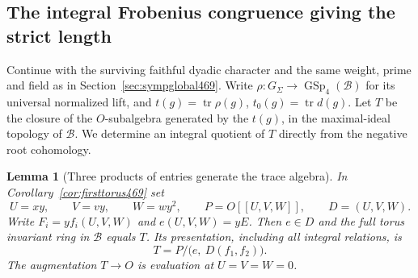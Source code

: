 \documentclass[a4paper,11pt]{article}
\newtheorem{lemma}[proposition]{Lemma}
\theoremstyle{definition}
\theoremstyle{remark}
\numberwithin{equation}{section}
\begin{document}
\subsection{The integral Frobenius congruence giving the strict length}
\label{sec:symptrace470}

Continue with the surviving faithful dyadic character and the same
weight, prime and field as in Section~\ref{sec:sympglobal469}. Write
\(\rho:G_\Sigma\to\operatorname{GSp}_4(\mathcal B)\) for its universal
normalized lift, and \(t(g)=\operatorname{tr}\rho(g)\),
\(t_0(g)=\operatorname{tr}d(g)\). Let \(T\) be the closure of the
\(O\)-subalgebra generated by the \(t(g)\), in the maximal-ideal
topology of \(\mathcal B\). We determine an integral quotient of
\(T\) directly from the negative root cohomology.

\begin{lemma}[Three products of entries generate the trace algebra]\leavevmode
\label{lem:invarianttrace470}
In Corollary~\ref{cor:firsttorus469} set
\[
     U=xy,\qquad V=vy,\qquad W=wy^2,\qquad
     P=O[[U,V,W]],\qquad D=(U,V,W).
\]
Write \(F_i=yf_i(U,V,W)\) and \(e(U,V,W)=yE\). Then \(e\in D\)
and the full torus invariant ring in \(\mathcal B\) equals \(T\).
Its presentation, including all integral relations, is
\[
                      T=P/\big(e,\ D(f_1,f_2)\big).
\]
The augmentation \(T\to O\) is evaluation at \(U=V=W=0\).
\end{lemma}
\end{document}
